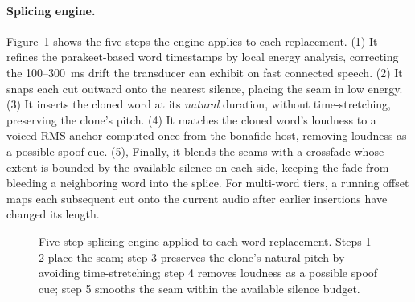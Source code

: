 \documentclass[11pt]{article}
\begin{document}
\paragraph{Splicing engine.} Figure~\ref{fig:splicesteps} shows the five
steps the engine applies to each replacement. (1) It refines the
parakeet-based word timestamps by local energy analysis, correcting the
100--\SI{300}{\milli\second} drift the transducer can exhibit on fast
connected speech. (2) It snaps each cut outward onto the nearest
silence, placing the seam in low energy. (3) It inserts the cloned
word at its \emph{natural} duration, without time-stretching, preserving
the clone's pitch. (4) It matches the cloned word's loudness to a
voiced-RMS anchor computed once from the bonafide host, removing loudness
as a possible spoof cue. (5), Finally, it blends the seams with a
crossfade whose extent is bounded by the available silence on each side,
keeping the fade from bleeding a neighboring word into the splice. For
multi-word tiers, a running offset maps each subsequent cut onto the
current audio after earlier insertions have changed its length.

\begin{figure}[t]
\centering
{}
\caption{Five-step splicing engine applied to each word replacement.
Steps 1--2 place the seam; step 3 preserves the clone's natural pitch by
avoiding time-stretching; step 4 removes loudness as a possible spoof
cue; step 5 smooths the seam within the available silence budget.}
\label{fig:splicesteps}
\end{figure}
\end{document}
